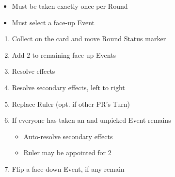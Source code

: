 \documentclass[10pt]{article}
\begin{document}
\addbackground
\addfooter


\begin{itemize}
	\item Must be taken exactly once per Round
	\item Must select a face-up Event
\end{itemize}
\begin{enumerate}
	\item Collect \ducats on the card and move Round Status marker
	\item Add 2 \ducats to remaining face-up Events
	\item Resolve effects
	\item {}Resolve secondary effects, left to right
	\item Replace Ruler (opt. if other PR's Turn)
	\item If everyone has taken an  and unpicked Event remains
	\begin{itemize}
		\item Auto-resolve secondary effects
		\item Ruler may be appointed for 2\adminpower
	\end{itemize}
	\item Flip a face-down Event, if any remain
\end{enumerate}
\end{document}
